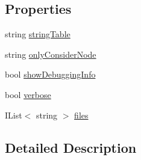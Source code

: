 \subsection*{Properties}
\begin{DoxyCompactItemize}
\item 
string \hyperlink{a00081_a7e43c3b73722956cb0f5d507e4eef527}{string\-Table}
\item 
string \hyperlink{a00081_af4c0062a1d46281d377f87084fde374e}{only\-Consider\-Node}
\item 
bool \hyperlink{a00022_a89964ea17bd19caf00cb5bff563ed01c}{show\-Debugging\-Info}
\item 
bool \hyperlink{a00022_ada4d83d1756918f362d55f6649b82b17}{verbose}
\item 
I\-List$<$ string $>$ \hyperlink{a00022_aa93cbb1bc1d5328e0a417012621e92d2}{files}
\end{DoxyCompactItemize}


\subsection{Detailed Description}


